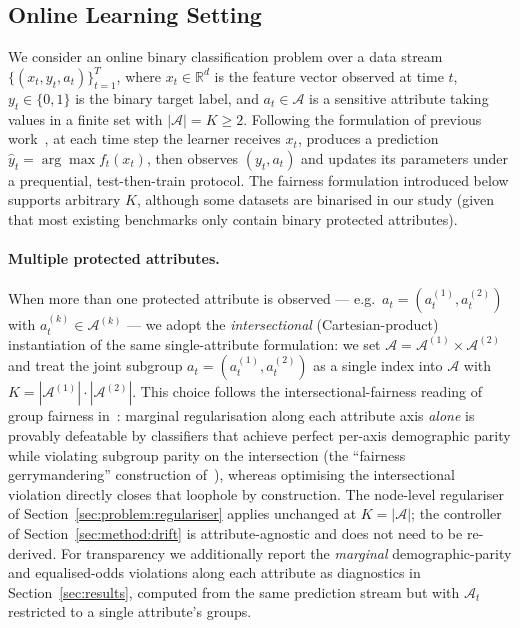 \documentclass[sigconf,anonymous,review]{acmart}
\begin{document}
\subsection{Online Learning Setting}
\label{sec:problem:online}
We consider an online binary classification problem over a data stream $\{(x_t, y_t, a_t)\}_{t=1}^{T}$, where $x_t \in \mathbb{R}^d$ is the feature vector observed at time $t$,
$y_t \in \{0,1\}$ is the binary target label, and $a_t \in \mathcal{A}$ is a sensitive attribute taking values in a finite set with $|\mathcal{A}|=K \ge 2$. Following the
formulation of previous work~\cite{chowdhury2024enhancing,ijcai2019p205}, at each time step the learner receives $x_t$, produces a prediction
$\hat{y}_t = \arg\max f_t(x_t)$, then observes $(y_t, a_t)$ and updates its parameters under a prequential, test-then-train protocol. The fairness formulation introduced below
supports arbitrary $K$, although some datasets are binarised in our study (given that most existing benchmarks only contain binary protected attributes).

\paragraph{Multiple protected attributes.}
\label{sec:problem:multi-attr}
When more than one protected attribute is observed --- e.g.\ $a_t = (a^{(1)}_t, a^{(2)}_t)$ with $a^{(k)}_t \in \mathcal{A}^{(k)}$ --- we adopt the
\emph{intersectional} (Cartesian-product) instantiation of the same single-attribute formulation: we set $\mathcal{A} = \mathcal{A}^{(1)} \times \mathcal{A}^{(2)}$ and treat
the joint subgroup $a_t = (a^{(1)}_t, a^{(2)}_t)$ as a single index into $\mathcal{A}$ with $K = |\mathcal{A}^{(1)}| \cdot |\mathcal{A}^{(2)}|$. This choice follows the
intersectional-fairness reading of group fairness in~\cite{kearns2018gerrymandering,foulds2020intersectional}: marginal regularisation along each attribute axis
\emph{alone} is provably defeatable by classifiers that achieve perfect per-axis demographic parity while violating subgroup parity on the intersection (the ``fairness
gerrymandering'' construction of~\cite{kearns2018gerrymandering}), whereas optimising the intersectional violation directly closes that loophole by construction. The
node-level regulariser of Section~\ref{sec:problem:regulariser} applies unchanged at $K = |\mathcal{A}|$; the controller of Section~\ref{sec:method:drift} is
attribute-agnostic and does not need to be re-derived. For transparency we additionally report the \emph{marginal} demographic-parity and equalised-odds violations
along each attribute as diagnostics in Section~\ref{sec:results}, computed from the same prediction stream but with $\mathcal{A}_t$ restricted to a single attribute's
groups.
\end{document}
